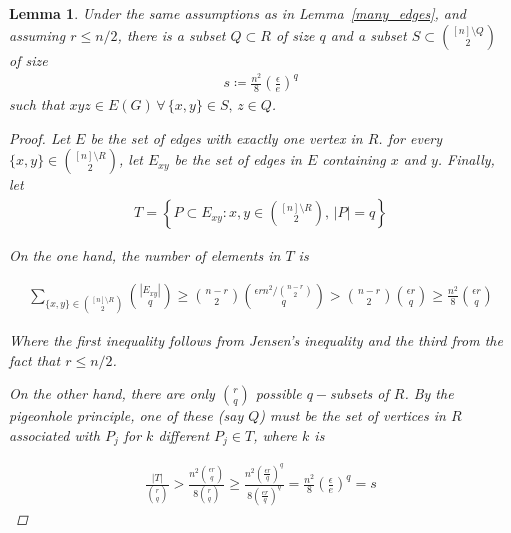 \documentclass[12pt]{article}
\newtheorem{lemma}[thm]{Lemma}
\begin{document}
    \begin{lemma}\label{s}
        Under the same assumptions as in Lemma~\ref{many_edges},
        and assuming $r \leq n/2$,
        there is a subset $Q \subset R$
        of size $q$  and a subset $S \subset \binom{[n] \setminus Q}{2}$ of size
        \begin{align*}
            s \coloneqq \frac{n^2}{8} \left(\frac{\epsilon}{e}\right)^q %
        \end{align*}
        such that $xyz \in E(G) \, \forall \, \{x, y\} \in S, \, z \in Q$.

        \begin{proof}
            Let $E$ be the set of edges with exactly one vertex in $R$.
            for every $\{x, y\} \in \binom{[n] \setminus R}{2}$, let $E_{xy}$ be the set of
            edges in $E$ containing $x$ and $y$.
            Finally, let
            \begin{align*}
                T = \left\{P \subset E_{xy} : x, y \in \binom{[n] \setminus R}{2} , \, |P| = q\right\}
            \end{align*}

            On the one hand, the number of elements in $T$ is

            \begin{align*}
                \sum_{\{x, y\} \in \binom{[n] \setminus R}{2}} \binom{|E_{xy}|}{q}
                \geq
                \binom{n - r}{2} \binom{\epsilon r n^2 / \binom{n-r}{2}}{q}
                >
                \binom{n - r}{2} \binom{\epsilon r}{q}
                \geq
                \frac{n^2}{8} \binom{\epsilon r}{q}
            \end{align*}

            Where the first inequality follows from Jensen's inequality and the third
            from the fact that $r \leq n/2$.

            On the other hand, there are only $\binom{r}{q}$ possible $q-$subsets of $R$.
            By the pigeonhole principle, one of these (say $Q$) must be the set of
            vertices in $R$ associated with $P_j$ for $k$ different $P_j \in T$, where $k$ is

            \begin{align*}
                \frac{|T|}{\binom{r}{q}} > \frac{n^2 \binom{\epsilon r}{q}}{8 \binom{r}{q}} \geq
                \frac{n^2\left( \frac{\epsilon r}{q}\right)^q}{8\left(\frac{e r}{q}\right)^q} =
                \frac{n^2}{8} \left(\frac{\epsilon}{e}\right)^q = s
            \end{align*}

        \end{proof}
    \end{lemma}
\end{document}
